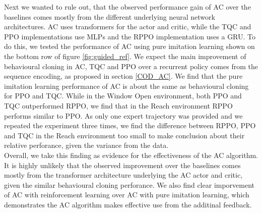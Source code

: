 Next we wanted to rule out, that the observed performance gain of AC over the baselines comes mostly from the different underlying neural network architectures. AC uses transformers for the actor and 
critic, while the TQC and PPO implementations use MLPs and the RPPO implementation uses a GRU. To do this, we tested the performance of AC using pure imitation learning shown on the bottom row of 
figure \ref{fig:guided_ref}. We expect the main improvement of behavioural cloning in AC, TQC and PPO over a recurrent policy comes from the sequence encoding, as proposed in section \ref{COD_AC}.
We find that the pure imitation learning performance 
of AC is about the same as behavioural cloning for PPO and TQC. While in the Window Open environment, both PPO and TQC outperformed RPPO, we find that in the Reach environment RPPO performs 
similar to PPO. As only one expert trajectory was provided and we repeated the experiment three times, we find the difference between RPPO, PPO and TQC in the Reach 
environment too small to make conclusion about their relative perforance, given the variance from the data. \\
Overall, we take this finding as evidence for the effectiveness of the AC algorithm. It is highly unlikely that the observed improvement 
over the baselines comes mostly from the transformer architecture underlying the AC actor and critic, given the similar behavioural cloning perforance. We also find clear imporvement of AC with 
reinforcement learning over AC with pure imitation learning, which demonstrates the AC algorithm makes effective use from the additinal feedback.  

